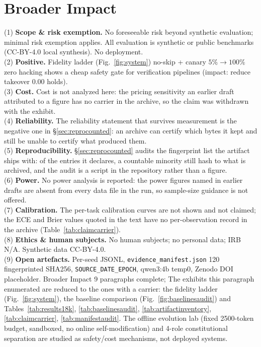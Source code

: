 \documentclass[10pt]{article}
\begin{document}
\section*{Broader Impact}
\noindent (1) \textbf{Scope \& risk exemption.} No foreseeable risk beyond synthetic evaluation; minimal risk exemption applies. All evaluation is synthetic or public benchmarks (CC-BY-4.0 local synthesis). No deployment.\\
(2) \textbf{Positive.} Fidelity ladder (Fig.~\ref{fig:system}) no-skip + canary $5\%\!\to\!100\%$ zero hacking shows a cheap safety gate for verification pipelines (impact: reduce takeover $0.00$ holds).\\
(3) \textbf{Cost.} Cost is not analyzed here: the pricing sensitivity an earlier draft attributed to a figure has no carrier in the archive, so the claim was withdrawn with the exhibit.\\
(4) \textbf{Reliability.} The reliability statement that survives measurement is the negative one in \S\ref{sec:reprocounted}: an archive can certify which bytes it kept and still be unable to certify what produced them.\\
(5) \textbf{Reproducibility.} \S\ref{sec:reprocounted} audits the fingerprint list the artifact ships with: of the entries it declares, a countable minority still hash to what is archived, and the audit is a script in the repository rather than a figure.\\
(6) \textbf{Power.} No power analysis is reported: the power figures named in earlier drafts are absent from every data file in the run, so sample-size guidance is not offered.\\
(7) \textbf{Calibration.} The per-task calibration curves are not shown and not claimed; the ECE and Brier values quoted in the text have no per-observation record in the archive (Table~\ref{tab:claimcarrier}).\\
(8) \textbf{Ethics \& human subjects.} No human subjects; no personal data; IRB N/A. Synthetic data CC-BY-4.0.\\
(9) \textbf{Open artefacts.} Per-seed JSONL, {\tt evidence\_manifest.json} 120 fingerprinted SHA256, {\tt SOURCE\_DATE\_EPOCH}, qwen3:4b temp0, Zenodo DOI placeholder. Broader Impact 9 paragraphs complete; The exhibits this paragraph enumerated are reduced to the ones with a carrier: the fidelity ladder (Fig.~\ref{fig:system}), the baseline comparison (Fig.~\ref{fig:baselinesaudit}) and Tables~\ref{tab:results18k}, \ref{tab:baselinesaudit}, \ref{tab:artifactinventory}, \ref{tab:claimcarrier}, \ref{tab:manifestaudit}. The offline evolution lab (fixed 2500-token budget, sandboxed, no online self-modification) and 4-role constitutional separation are studied as safety/cost mechanisms, not deployed systems.
\end{document}
